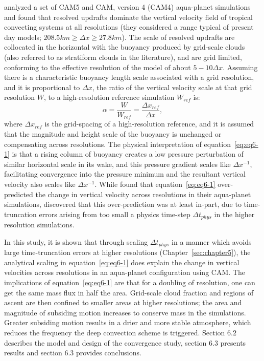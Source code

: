 \cite{HR2017JCLIM,HR2018JAMES} analyzed a set of CAM5 and CAM, version 4 (CAM4) aqua-planet simulations and found that resolved updrafts dominate the vertical velocity field of tropical convecting systems at all resolutions (they considered a range typical of present day models; $208.5 km \geq \Delta x \geq 27.8 km$). The scale of resolved updrafts are collocated in the horizontal with the buoyancy produced by grid-scale clouds (also referred to as stratiform clouds in the literature), and are grid limited, conforming to the effective resolution of the model of about $5-10\Delta x$. Assuming there is a characteristic buoyancy length scale associated with a grid resolution, and it is proportional to $\Delta x$, the ratio of the vertical velocity scale at that grid resolution $W$, to a high-resolution reference simulation $W_{ref}$ is:
\begin{equation}
\alpha = \frac{W}{W_{ref}} = \frac{\Delta x_{ref}}{\Delta x} , \label{eq:eq6-1}
\end{equation}
where $\Delta x_{ref}$ is the grid-spacing of a high-resolution reference, and it is assumed that the magnitude and height scale of the buoyancy is unchanged or compensating across resolutions. The physical interpretation of equation~\ref{eq:eq6-1} is that a rising column of buoyancy creates a low pressure perturbation of similar horizontal scale in its wake, and this pressure gradient scales like $\Delta x^{-1}$, facilitating convergence into the pressure minimum and the resultant vertical velocity also scales like $\Delta x^{-1}$. While \cite{HR2017JCLIM} found that equation~\ref{eq:eq6-1} over-predicted the change in vertical velocity across resolutions in their aqua-planet simulations, \cite{HR2017JCLIM} discovered that this over-prediction was at least in-part, due to time-truncation errors arising from too small a physics time-step $\Delta t_{phys}$ in the higher resolution simulations.

In this study, it is shown that through scaling $\Delta t_{phys}$ in a manner which avoids large time-truncation errors at higher resolutions (Chapter~\ref{sec:chapter5}), the analytical scaling in equation~\ref{eq:eq6-1} does explain the change in vertical velocities across resolutions in an aqua-planet configuration using CAM. The implications of equation~\ref{eq:eq6-1} are that for a doubling of resolution, one can get the same mass flux in half the area. Grid-scale cloud fraction and regions of ascent are then confined to smaller areas at higher resolutions; the area and magnitude of subsiding motion increases to conserve mass in the simulations. Greater subsiding motion results in a drier and more stable atmosphere, which reduces the frequency the deep convection scheme is triggered. Section $6.2$ describes the model and design of the convergence study, section 6.3 presents results and section 6.3 provides conclusions.

